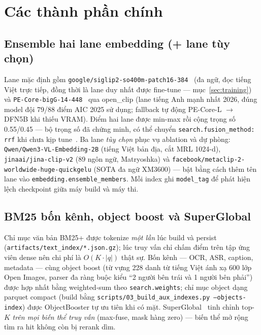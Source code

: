 \documentclass{ai_conquer2026}
\begin{document}
\section{Các thành phần chính}

\subsection{Ensemble hai lane embedding (+ lane tùy chọn)}\label{sec:lanes}
Lane mặc định gồm \texttt{google/siglip2-so400m-patch16-384}~\cite{tschannen2025siglip2}
(đa ngữ, đọc tiếng Việt trực tiếp, đồng thời là lane duy nhất được fine-tune ---
mục~\ref{sec:training}) và \texttt{PE-Core-bigG-14-448}~\cite{bolya2025pe} qua open\_clip
(lane tiếng Anh mạnh nhất 2026, đúng model đội 79/88 điểm AIC 2025 sử dụng; fallback tự động
PE-Core-L $\rightarrow$ DFN5B khi thiếu VRAM). Điểm hai lane được min-max rồi cộng trọng số
0.55/0.45 --- bộ trọng số đã chứng minh, có thể chuyển \texttt{search.fusion\_method: rrf}
khi chưa kịp tune~\cite{bruch2023fusion}. Ba lane \emph{tùy chọn} phục vụ ablation và dự
phòng: \texttt{Qwen/Qwen3-VL-Embedding-2B} (tiếng Việt bản địa, cắt MRL 1024-d),
\texttt{jinaai/jina-clip-v2} (89 ngôn ngữ, Matryoshka) và
\texttt{facebook/metaclip-2-worldwide-huge-quickgelu} (SOTA đa ngữ XM3600) --- bật bằng cách
thêm tên lane vào \texttt{embedding.ensemble\_members}. Mỗi index ghi \texttt{model\_tag}
để phát hiện lệch checkpoint giữa máy build và máy thi.

\subsection{BM25 bốn kênh, object boost và SuperGlobal}
Chỉ mục văn bản BM25+ được tokenize \emph{một lần} lúc build và persist
(\texttt{artifacts/text\_index/*.json.gz}); lúc truy vấn chỉ chấm điểm trên tập ứng viên dense
nên chi phí là $O(K\cdot|q|)$ thật sự. Bốn kênh --- OCR, ASR, caption, metadata --- cùng
object boost (từ vựng 228 danh từ tiếng Việt ánh xạ 600 lớp Open Images, parser đa ràng buộc
kiểu ``2 người bên trái và 1 người bên phải'') được hợp nhất bằng weighted-sum theo
\texttt{search.weights}; chỉ mục object dạng parquet compact (build bằng
\texttt{scripts/03\_build\_aux\_indexes.py --objects-index}) được ObjectBooster tự ưu tiên khi
có mặt. SuperGlobal~\cite{shao2023superglobal} tinh chỉnh top-$K$ \emph{trên mọi biến thể truy
vấn} (max-fuse, mask hàng zero) --- biến thể mở rộng tìm ra hit không còn bị rerank dìm.
\end{document}
